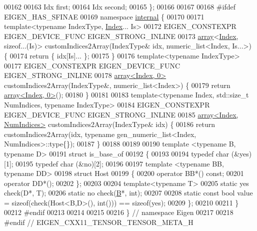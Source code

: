 \begin{DoxyCode}
00162 
00163   Idx first;
00164   Idx second;
00165 \};
00166 
00167 
00168 \textcolor{preprocessor}{#ifdef EIGEN\_HAS\_SFINAE}
00169 \textcolor{keyword}{namespace }\hyperlink{namespaceinternal}{internal} \{
00170 
00171   \textcolor{keyword}{template}<\textcolor{keyword}{typename} IndexType, \hyperlink{namespace_eigen_a62e77e0933482dafde8fe197d9a2cfde}{Index}... Is>
00172   EIGEN\_CONSTEXPR EIGEN\_DEVICE\_FUNC EIGEN\_STRONG\_INLINE
00173   \hyperlink{class_eigen_1_1array}{array}<\hyperlink{namespace_eigen_a62e77e0933482dafde8fe197d9a2cfde}{Index}, \textcolor{keyword}{sizeof}...(Is)> customIndices2Array(IndexType& idx, numeric\_list<Index, Is...>) \{
00174     \textcolor{keywordflow}{return} \{ idx[Is]... \};
00175   \}
00176   \textcolor{keyword}{template}<\textcolor{keyword}{typename} IndexType>
00177   EIGEN\_CONSTEXPR EIGEN\_DEVICE\_FUNC EIGEN\_STRONG\_INLINE
00178   \hyperlink{class_eigen_1_1array}{array<Index, 0>} customIndices2Array(IndexType&, numeric\_list<Index>) \{
00179     \textcolor{keywordflow}{return} \hyperlink{class_eigen_1_1array}{array<Index, 0>}();
00180   \}
00181 
00183   \textcolor{keyword}{template}<\textcolor{keyword}{typename} Index, std::\textcolor{keywordtype}{size\_t} NumIndices, \textcolor{keyword}{typename} IndexType>
00184   EIGEN\_CONSTEXPR EIGEN\_DEVICE\_FUNC EIGEN\_STRONG\_INLINE
00185   \hyperlink{class_eigen_1_1array}{array<Index, NumIndices>} customIndices2Array(IndexType& idx) \{
00186     \textcolor{keywordflow}{return} customIndices2Array(idx, \textcolor{keyword}{typename} gen\_numeric\_list<Index, NumIndices>::type\{\});
00187   \}
00188 
00189 
00190   \textcolor{keyword}{template} <\textcolor{keyword}{typename} B, \textcolor{keyword}{typename} D>
00191   \textcolor{keyword}{struct }is\_base\_of
00192   \{
00193 
00194     \textcolor{keyword}{typedef} char (&yes)[1];
00195     \textcolor{keyword}{typedef} char (&no)[2];
00196 
00197     \textcolor{keyword}{template} <\textcolor{keyword}{typename} BB, \textcolor{keyword}{typename} DD>
00198     \textcolor{keyword}{struct }Host
00199     \{
00200       \textcolor{keyword}{operator} BB*() \textcolor{keyword}{const};
00201       \textcolor{keyword}{operator} DD*();
00202     \};
00203 
00204     \textcolor{keyword}{template}<\textcolor{keyword}{typename} T>
00205     \textcolor{keyword}{static} yes check(D*, T);
00206     \textcolor{keyword}{static} no check(\hyperlink{group___core___module_class_eigen_1_1_matrix}{B}*, \textcolor{keywordtype}{int});
00207 
00208     \textcolor{keyword}{static} \textcolor{keyword}{const} \textcolor{keywordtype}{bool} value = \textcolor{keyword}{sizeof}(check(Host<B,D>(), \textcolor{keywordtype}{int}())) == \textcolor{keyword}{sizeof}(yes);
00209   \};
00210 
00211 \}
00212 \textcolor{preprocessor}{#endif}
00213 
00214 
00215 
00216 \}  \textcolor{comment}{// namespace Eigen}
00217 
00218 \textcolor{preprocessor}{#endif  // EIGEN\_CXX11\_TENSOR\_TENSOR\_META\_H}
\end{DoxyCode}
